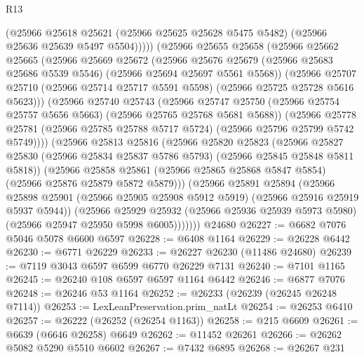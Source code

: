 \begin{lexlean}{R13}
\begin{coremodule}
              (@25966
                @25618
                @25621
                (@25966 @25625 @25628 @5475 @5482)
                (@25966 @25636 @25639 @5497 @5504)))))
        (@25966
          @25655
          @25658
          (@25966
            @25662
            @25665
            (@25966
              @25669
              @25672
              (@25966
                @25676
                @25679
                (@25966 @25683 @25686 @5539 @5546)
                (@25966 @25694 @25697 @5561 @5568))
              (@25966
                @25707
                @25710
                (@25966 @25714 @25717 @5591 @5598)
                (@25966 @25725 @25728 @5616 @5623)))
            (@25966
              @25740
              @25743
              (@25966
                @25747
                @25750
                (@25966 @25754 @25757 @5656 @5663)
                (@25966 @25765 @25768 @5681 @5688))
              (@25966
                @25778
                @25781
                (@25966 @25785 @25788 @5717 @5724)
                (@25966 @25796 @25799 @5742 @5749))))
          (@25966
            @25813
            @25816
            (@25966
              @25820
              @25823
              (@25966
                @25827
                @25830
                (@25966 @25834 @25837 @5786 @5793)
                (@25966 @25845 @25848 @5811 @5818))
              (@25966
                @25858
                @25861
                (@25966 @25865 @25868 @5847 @5854)
                (@25966 @25876 @25879 @5872 @5879)))
            (@25966
              @25891
              @25894
              (@25966
                @25898
                @25901
                (@25966 @25905 @25908 @5912 @5919)
                (@25966 @25916 @25919 @5937 @5944))
              (@25966
                @25929
                @25932
                (@25966 @25936 @25939 @5973 @5980)
                (@25966 @25947 @25950 @5998 @6005)))))))
    @24680
@26227 := @6682 @7076 @5046 @5078 @6600 @6597
@26228 := @6408 @1164
@26229 := @26228 @6442
@26230 := @6771 @26229
@26233 := @26227 @26230 (@11486 @24680)
@26239 := @7119 @3043 @6597 @6599 @6770 @26229 @7131
@26240 := @7101 @1165
@26245 := @26240 @108 @6597 @6597 @1164 @6442
@26246 := @6877 @7076
@26248 := @26246 @53 @1164
@26252 := @26233 (@26239 (@26245 @26248 @7114))
@26253 := LexLeanPreservation.prim_natLt
@26254 := @26253 @6410
@26257 := @26222 (@26252 (@26254 @1163))
@26258 := @215 @6609
@26261 := @6639 (@6646 @26258) @6649
@26262 := @11452 @26261
@26266 := @26262 @5082 @5290 @5510 @6602
@26267 := @7432 @6895
@26268 := @26267 @231

\end{coremodule}
\end{lexlean}
